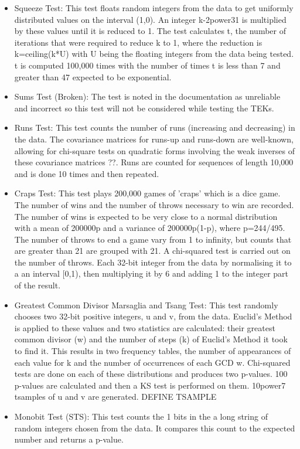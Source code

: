 \begin{itemize}
\item Squeeze Test: This test floats random integers from the data to get uniformly distributed values on the interval (1,0). An integer k-2power31 is multiplied by these values until it is reduced to 1. The test calculates t, the number of iterations that were required to reduce k to 1, where the reduction is k=ceiling(k*U) with U being the floating integers from the data being tested. t is computed 100,000 times with the number of times t is less than 7 and greater than 47 expected to be exponential.
\item Sums Test (Broken): The test is noted in the documentation as unreliable and incorrect so this test will not be considered while testing the TEKs.
\item Runs Test: This test counts the number of runs (increasing and decreasing) in the data. The covariance matrices for runs-up and runs-down are well-known, allowing for chi-square tests on quadratic forms involving the weak inverses of these covariance matrices ??. Runs are counted for sequences of length 10,000 and is done 10 times and then repeated.
\item Craps Test: This test plays 200,000 games of 'craps' which is a dice game. The number of wins and the number of throws necessary to win are recorded. The number of wins is expected to be very close to a normal distribution with a mean of 200000p and a variance of 200000p(1-p), where p=244/495. The number of throws to end a game vary from 1 to infinity, but counts that are greater than 21 are grouped with 21. A chi-squared test is carried out on the number of throws. Each 32-bit integer from the data by normalising it to a an interval [0,1), then multiplying it by 6 and adding 1 to the integer part of the result. 
\item Greatest Common Divisor Marsaglia and Tsang Test: This test randomly chooses two 32-bit positive integers, u and v, from the data. Euclid's Method is applied to these values and two statistics are calculated: their greatest common divisor (w) and the number of steps (k) of Euclid's Method it took to find it. This results in two frequency tables, the number of appearances of each value for k and the number of occurrences of each GCD w. Chi-squared tests are done on each of these distributions and produces two p-values. 100 p-values are calculated and then a KS test is performed on them. 10power7 tsamples of u and v are generated. DEFINE TSAMPLE
\item Monobit Test (STS): This test counts the 1 bits in the a long string of random integers chosen from the data. It compares this count to the expected number and returns a p-value.

\end{itemize}
